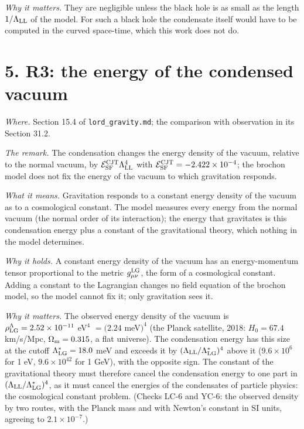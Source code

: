 \documentclass[
  10pt,
]{article}
\begin{document}
\emph{Why it matters.} They are negligible unless the black hole is as
small as the length \(1/\Lambda_{\rm LL}\) of the model. For such a
black hole the condensate itself would have to be computed in the curved
space-time, which this work does not do.

\hypertarget{r3-the-energy-of-the-condensed-vacuum}{%
\section{5. R3: the energy of the condensed
vacuum}\label{r3-the-energy-of-the-condensed-vacuum}}

\emph{Where.} Section 15.4 of \texttt{lord\_gravity.md}; the comparison
with observation in its Section 31.2.

\emph{The remark.} The condensation changes the energy density of the
vacuum, relative to the normal vacuum, by
\(\mathcal E^{\rm CJT}_{\rm SF}\Lambda_{\rm LL}^4\) with
\(\mathcal E^{\rm CJT}_{\rm SF}=-2.422\times10^{-4}\); the brochon model
does not fix the energy of the vacuum to which gravitation responds.

\emph{What it means.} Gravitation responds to a constant energy density
of the vacuum as to a cosmological constant. The model measures every
energy from the normal vacuum (the normal order of its interaction); the
energy that gravitates is this condensation energy plus a constant of
the gravitational theory, which nothing in the model determines.

\emph{Why it holds.} A constant energy density of the vacuum has an
energy-momentum tensor proportional to the metric
\(g^{\rm LG}_{\mu\nu}\), the form of a cosmological constant. Adding a
constant to the Lagrangian changes no field equation of the brochon
model, so the model cannot fix it; only gravitation sees it.

\emph{Why it matters.} The observed energy density of the vacuum is
\(\rho^\Lambda_{\rm LG}=2.52\times10^{-11}\) eV\(^4\) \(=(2.24\)
meV\()^4\) (the Planck satellite, 2018: \(H_0=67.4\) km/s/Mpc,
\(\Omega_{\rm m}=0.315\), a flat universe). The condensation energy has
this size at the cutoff \(\Lambda^*_{\rm LG}=18.0\) meV and exceeds it
by \((\Lambda_{\rm LL}/\Lambda^*_{\rm LG})^4\) above it
(\(9.6\times10^{6}\) for 1 eV, \(9.6\times10^{42}\) for 1 GeV), with the
opposite sign. The constant of the gravitational theory must therefore
cancel the condensation energy to one part in
\((\Lambda_{\rm LL}/\Lambda^*_{\rm LG})^4\), as it must cancel the
energies of the condensates of particle physics: the cosmological
constant problem. (Checks LC-6 and YC-6: the observed density by two
routes, with the Planck mass and with Newton's constant in SI units,
agreeing to \(2.1\times10^{-7}\).)
\end{document}
